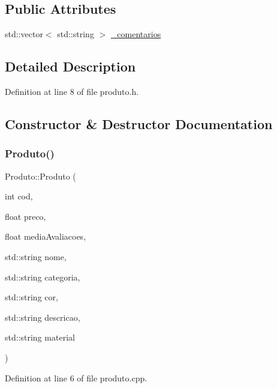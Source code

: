 \subsection*{Public Attributes}
\begin{DoxyCompactItemize}
\item 
std\+::vector$<$ std\+::string $>$ \hyperlink{class_produto_a72be5ef0141a079e03c2b0d65d3f331d}{\+\_\+comentarios}
\end{DoxyCompactItemize}


\subsection{Detailed Description}


Definition at line 8 of file produto.\+h.



\subsection{Constructor \& Destructor Documentation}
\mbox{\label{class_produto_a65e9a58ad28d6e5c7482c09c0acb77aa}} 
\subsubsection{\texorpdfstring{Produto()}{Produto()}}
{\footnotesize\ttfamily Produto\+::\+Produto (\begin{DoxyParamCaption}\item[{int}]{cod,  }\item[{float}]{preco,  }\item[{float}]{media\+Avaliacoes,  }\item[{std\+::string}]{nome,  }\item[{std\+::string}]{categoria,  }\item[{std\+::string}]{cor,  }\item[{std\+::string}]{descricao,  }\item[{std\+::string}]{material }\end{DoxyParamCaption})}



Definition at line 6 of file produto.\+cpp.

\mbox{\label{class_produto_a84a8b28176b743e8c74bfd89aee9a9b2}} 
